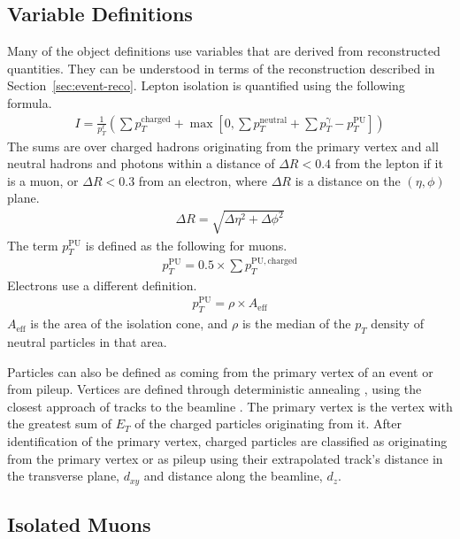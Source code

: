 \subsection{Variable Definitions}

Many of the object definitions use variables that are derived from reconstructed quantities.
They can be understood in terms of the reconstruction
described in Section~\ref{sec:event-reco}.
Lepton isolation is quantified using the following formula.
\begin{gather}
  I = \frac{1}{p_T^\ell} \left(\sum p_T^\mathrm{charged} +
      \max\left[0, \sum p_T^\mathrm{neutral} +
               \sum p_T^\mathrm{\gamma} - p_T^\mathrm{PU}
               \right]\right) \label{eq:isolation}
\end{gather}
The sums are over charged hadrons originating from the primary vertex
and all neutral hadrons and photons within a distance of $\Delta R < 0.4$
from the lepton if it is a muon, or $\Delta R < 0.3$ from an electron,
where $\Delta R$ is a distance on the $(\eta, \phi)$ plane.
\begin{gather}
  \Delta R = \sqrt{\Delta\eta^2 + \Delta\phi^2}
\end{gather}
The term $p_T^\mathrm{PU}$ is defined as the following for muons.
\begin{gather}
  p_T^\mathrm{PU} = 0.5 \times \sum p_T^{\mathrm{PU}, \mathrm{charged}}
\end{gather}
Electrons use a different definition.
\begin{gather}
  p_T^\mathrm{PU} = \rho \times A_\mathrm{eff}
\end{gather}
$A_\mathrm{eff}$ is the area of the isolation cone,
and $\rho$ is the median of the $p_T$ density of neutral particles in that area.

Particles can also be defined as coming from the primary vertex of an event or from pileup.
Vertices are defined through deterministic annealing \cite{726788},
using the closest approach of tracks to the beamline \cite{Collaboration_2014}.
The primary vertex is the vertex with
the greatest sum of $E_T$ of the charged particles originating from it.
After identification of the primary vertex,
charged particles are classified as originating from the primary vertex or as pileup
using their extrapolated track's distance in the transverse plane, $d_{xy}$
and distance along the beamline, $d_z$.

\subsection{Isolated Muons} \label{sec:muon-def}


